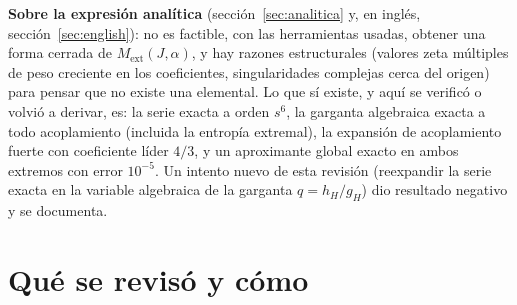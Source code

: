 \documentclass[10pt,a4paper]{article}
\newcommand{\ext}{\mathrm{ext}}
\begin{document}
\textbf{Sobre la expresión analítica} (sección~\ref{sec:analitica} y, en inglés,
sección~\ref{sec:english}): no es factible, con las herramientas usadas, obtener una forma cerrada
de $M_\ext(J,\alpha)$, y hay razones estructurales (valores zeta múltiples de peso creciente en
los coeficientes, singularidades complejas cerca del origen) para pensar que no existe una
elemental. Lo que sí existe, y aquí se verificó o volvió a derivar, es: la serie exacta a orden
$s^6$, la garganta algebraica exacta a todo acoplamiento (incluida la entropía extremal), la
expansión de acoplamiento fuerte con coeficiente líder $4/3$, y un aproximante global exacto en
ambos extremos con error $10^{-5}$. Un intento nuevo de esta revisión (reexpandir la serie exacta
en la variable algebraica de la garganta $q=h_H/g_H$) dio resultado negativo y se documenta.

\section{Qué se revisó y cómo}
\end{document}
